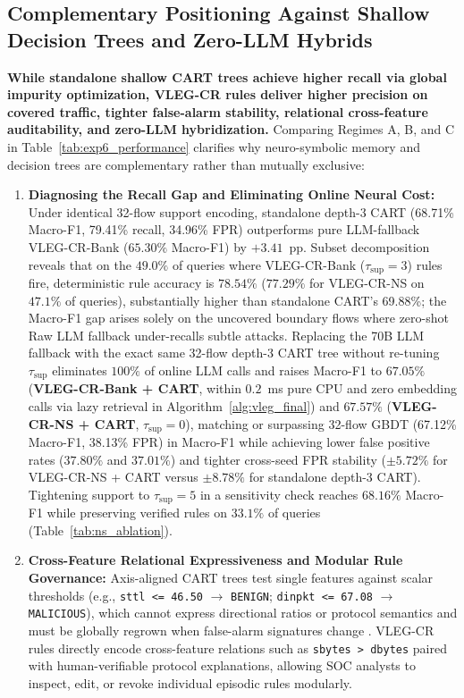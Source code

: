 \documentclass[11pt,letterpaper,onecolumn]{article}
\begin{document}
\subsection{Complementary Positioning Against Shallow Decision Trees and Zero-LLM Hybrids}
\label{sec:exp7}
\textbf{While standalone shallow CART trees achieve higher recall via global impurity optimization, VLEG-CR rules deliver higher precision on covered traffic, tighter false-alarm stability, relational cross-feature auditability, and zero-LLM hybridization.} Comparing Regimes A, B, and C in Table~\ref{tab:exp6_performance} clarifies why neuro-symbolic memory and decision trees are complementary rather than mutually exclusive:
\begin{enumerate}[leftmargin=1.8em,topsep=2pt,itemsep=2pt]
    \item \textbf{Diagnosing the Recall Gap and Eliminating Online Neural Cost:} Under identical 32-flow support encoding, standalone depth-3 CART (68.71\% Macro-F1, 79.41\% recall, 34.96\% FPR) outperforms pure LLM-fallback VLEG-CR-Bank ($65.30\%$ Macro-F1) by $+3.41$~pp. Subset decomposition reveals that on the $49.0\%$ of queries where VLEG-CR-Bank ($\tau_{\mathrm{sup}}=3$) rules fire, deterministic rule accuracy is \textbf{$78.54\%$} ($77.29\%$ for VLEG-CR-NS on $47.1\%$ of queries), substantially higher than standalone CART's 69.88\%; the Macro-F1 gap arises solely on the uncovered boundary flows where zero-shot Raw LLM fallback under-recalls subtle attacks. Replacing the 70B LLM fallback with the exact same 32-flow depth-3 CART tree without re-tuning $\tau_{\mathrm{sup}}$ eliminates $100\%$ of online LLM calls and raises Macro-F1 to \textbf{$67.05\%$} (\textbf{VLEG-CR-Bank + CART}, within $0.2$~ms pure CPU and zero embedding calls via lazy retrieval in Algorithm~\ref{alg:vleg_final}) and \textbf{$67.57\%$} (\textbf{VLEG-CR-NS + CART}, $\tau_{\mathrm{sup}}=0$), matching or surpassing 32-flow GBDT (67.12\% Macro-F1, 38.13\% FPR) in Macro-F1 while achieving lower false positive rates ($37.80\%$ and $37.01\%$) and tighter cross-seed FPR stability ($\pm 5.72\%$ for VLEG-CR-NS + CART versus $\pm 8.78\%$ for standalone depth-3 CART). Tightening support to $\tau_{\mathrm{sup}}=5$ in a sensitivity check reaches $68.16\%$ Macro-F1 while preserving verified rules on $33.1\%$ of queries (Table~\ref{tab:ns_ablation}).
    \item \textbf{Cross-Feature Relational Expressiveness and Modular Rule Governance:} Axis-aligned CART trees test single features against scalar thresholds (e.g., \texttt{sttl <= 46.50} $\to$ \texttt{BENIGN}; \texttt{dinpkt <= 67.08} $\to$ \texttt{MALICIOUS}), which cannot express directional ratios or protocol semantics and must be globally regrown when false-alarm signatures change \cite{jacobs2022ai}. VLEG-CR rules directly encode cross-feature relations such as \texttt{sbytes > dbytes} paired with human-verifiable protocol explanations, allowing SOC analysts to inspect, edit, or revoke individual episodic rules modularly.
\end{enumerate}
\end{document}
